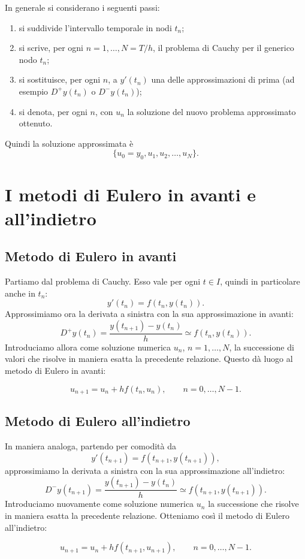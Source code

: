 \documentclass[11pt,a4paper]{report}
\begin{document}
In generale si considerano i seguenti passi:
\begin{enumerate}[label=\arabic*)]
\item si suddivide l'intervallo temporale in nodi $t_n$;
\item si scrive, per ogni $n=1,\dots,N=T/h$, il problema di Cauchy per il generico nodo $t_n$;
\item si sostituisce, per ogni $n$, a $y'(t_n)$ una delle approssimazioni di prima (ad esempio $D^+y(t_n)$ o $D^-y(t_n)$);
\item si denota, per ogni $n$, con $u_n$ la soluzione del nuovo problema approssimato ottenuto.
\end{enumerate}
Quindi la soluzione approssimata \`e
\[
 \{u_0=y_0,u_1,u_2,\dots,u_N\}.
\]

\section{I metodi di Eulero in avanti e all'indietro}
\subsection{Metodo di Eulero in avanti}
Partiamo dal problema di Cauchy. Esso vale per ogni $t\in I$, quindi in particolare anche in $t_n$:
\[
 y'(t_n)=f(t_n,y(t_n)).
\]
Approssimiamo ora la derivata a sinistra con la sua approssimazione in avanti:
\[
 D^+y(t_n)=\frac{y(t_{n+1})-y(t_n)}{h}\simeq f(t_n,y(t_n)).
\]
Introduciamo allora come soluzione numerica $u_n$, $n=1,\dots,N$, la successione di valori che risolve in maniera esatta la precedente relazione. Questo d\`a luogo al metodo di Eulero in avanti:
\begin{formulaBox}
\[
 u_{n+1}=u_n+h f(t_n,u_n),
 \qquad n=0,\dots,N-1.
\]
\end{formulaBox}

\subsection{Metodo di Eulero all'indietro}
In maniera analoga, partendo per comodit\`a da
\[
 y'(t_{n+1})=f(t_{n+1},y(t_{n+1})),
\]
approssimiamo la derivata a sinistra con la sua approssimazione all'indietro:
\[
 D^-y(t_{n+1})=\frac{y(t_{n+1})-y(t_n)}{h}\simeq f(t_{n+1},y(t_{n+1})).
\]
Introduciamo nuovamente come soluzione numerica $u_n$ la successione che risolve in maniera esatta la precedente relazione. Otteniamo cos\`i il metodo di Eulero all'indietro:
\begin{formulaBox}
\[
 u_{n+1}=u_n+h f(t_{n+1},u_{n+1}),
 \qquad n=0,\dots,N-1.
\]
\end{formulaBox}
\end{document}
